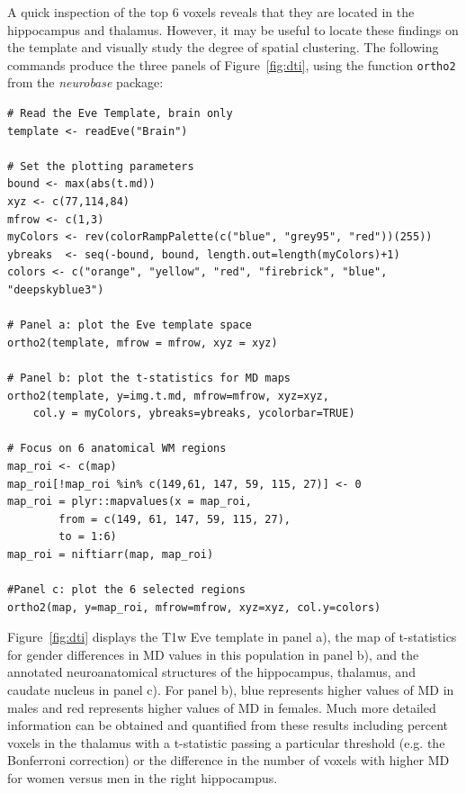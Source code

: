 \documentclass[]{elsarticle} %
\newcommand{\code}[1]{\texttt{#1}}
\newcommand{\pkg}[1]{\emph{#1}}
\begin{document}
A quick inspection of the top $6$ voxels reveals that they are located in the hippocampus and thalamus. However, it may be  useful to locate these findings on the template and visually study the degree of spatial clustering. The following commands produce the three panels of Figure~\ref{fig:dti}, using the function \code{ortho2} from the \pkg{neurobase} package:
\color{blue}
\begin{verbatim}
# Read the Eve Template, brain only
template <- readEve("Brain")

# Set the plotting parameters
bound <- max(abs(t.md))
xyz <- c(77,114,84)
mfrow <- c(1,3)
myColors <- rev(colorRampPalette(c("blue", "grey95", "red"))(255))
ybreaks  <- seq(-bound, bound, length.out=length(myColors)+1)
colors <- c("orange", "yellow", "red", "firebrick", "blue", "deepskyblue3")

# Panel a: plot the Eve template space
ortho2(template, mfrow = mfrow, xyz = xyz)

# Panel b: plot the t-statistics for MD maps
ortho2(template, y=img.t.md, mfrow=mfrow, xyz=xyz, 
    col.y = myColors, ybreaks=ybreaks, ycolorbar=TRUE)

# Focus on 6 anatomical WM regions 
map_roi <- c(map)
map_roi[!map_roi %in% c(149,61, 147, 59, 115, 27)] <- 0
map_roi = plyr::mapvalues(x = map_roi, 
		from = c(149, 61, 147, 59, 115, 27),
		to = 1:6)
map_roi = niftiarr(map, map_roi)

#Panel c: plot the 6 selected regions
ortho2(map, y=map_roi, mfrow=mfrow, xyz=xyz, col.y=colors)
\end{verbatim}
\color{black}

Figure~\ref{fig:dti} displays the T1w Eve template in panel a), the map of t-statistics for gender differences in MD values in this population in panel b), and the annotated neuroanatomical structures of the hippocampus, thalamus, and caudate nucleus in panel c).  For panel b), blue represents higher values of MD in males and red represents higher values of MD in females. Much more detailed information can be obtained and quantified from these results including percent voxels in the thalamus with a t-statistic passing a particular threshold (e.g. the Bonferroni correction) or the difference in the number of voxels with higher MD for women versus men in the right hippocampus.
\end{document}
